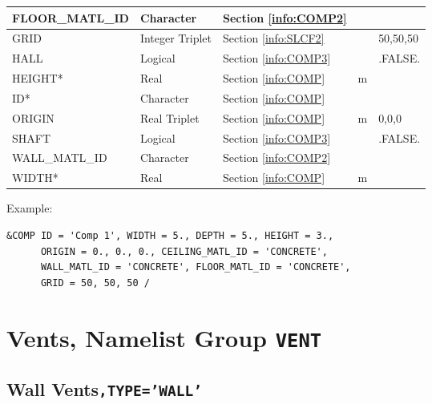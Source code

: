 \begin{minipage}{6.5in}
\begin{longtable}{|l|l|l|l|l@{\extracolsep{\fill}}|}
{\ct FLOOR\_MATL\_ID}       & Character		 & Section \ref{info:COMP2}               &           &                 \\ \hline
{\ct GRID}             & Integer Triplet& Section \ref{info:SLCF2}               &           & 50,50,50                \\ \hline
{\ct HALL}                  & Logical  		 & Section \ref{info:COMP3}               &           & {\ct .FALSE.}   \\ \hline
{\ct HEIGHT}*                & Real     		 & Section \ref{info:COMP}   	          & m         &                 \\ \hline
{\ct ID}*                    & Character		 & Section \ref{info:COMP}                &           &          \\ \hline
{\ct ORIGIN}           & Real Triplet   & Section \ref{info:COMP}                & m         & 0,0,0                \\ \hline
{\ct SHAFT}                 & Logical  		 & Section \ref{info:COMP3}                 &           & {\ct .FALSE.}   \\ \hline
{\ct WALL\_MATL\_ID}        & Character		 & Section \ref{info:COMP2}                 &           &                 \\ \hline
{\ct WIDTH}*                 & Real               & Section \ref{info:COMP}                  & m         &                 \\ \hline
\end{longtable}
\end{minipage}

\vspace{\baselineskip}
\noindent Example:
\begin{lstlisting}
&COMP ID = 'Comp 1', WIDTH = 5., DEPTH = 5., HEIGHT = 3.,
      ORIGIN = 0., 0., 0., CEILING_MATL_ID = 'CONCRETE',
      WALL_MATL_ID = 'CONCRETE', FLOOR_MATL_ID = 'CONCRETE',
      GRID = 50, 50, 50 /
\end{lstlisting}




\clearpage
\section{Vents, Namelist Group \texorpdfstring{{\tt VENT}}{VENT}}
\label{info:VENT6}

\subsection{Wall Vents\texorpdfstring{{\tt ,TYPE='WALL'}}{, TYPE='WALL'}}

